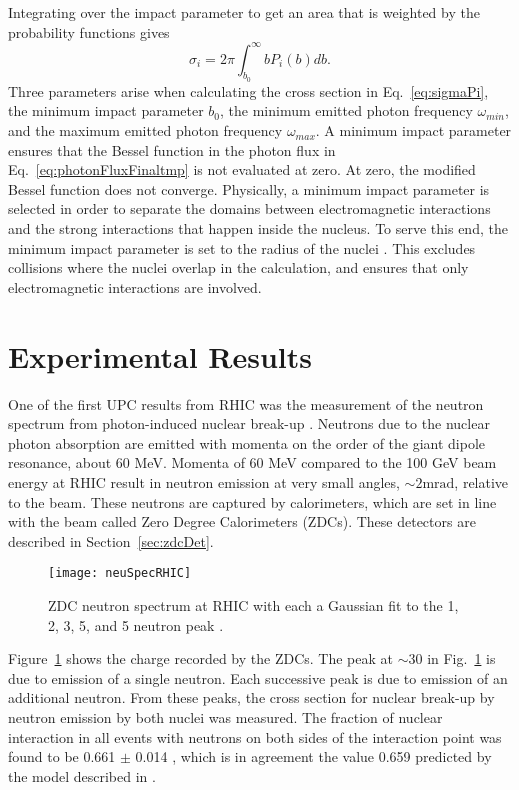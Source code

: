     Integrating over the impact parameter to get an area that 
      is weighted by the probability functions gives \cite{emPCite3,emPCite4}
      \begin{equation}
        \sigma_{i}=2\pi\int^{\infty}_{b_{0}}bP_{i}(b)db.
        \label{eq:sigmaPi}
      \end{equation}
    Three parameters arise when calculating the cross section in Eq.~\ref{eq:sigmaPi}, the 
      minimum impact parameter $b_{0}$, the minimum emitted photon frequency 
      $\omega_{min}$, and the maximum emitted photon frequency $\omega_{max}$.
    A minimum impact parameter ensures that the Bessel 
      function in the photon flux in Eq.~\ref{eq:photonFluxFinaltmp} is not
      evaluated at zero.
    At zero, the modified Bessel function does not converge.
    Physically, a minimum impact parameter is selected in order to separate the
      domains between electromagnetic interactions and the strong interactions 
      that happen inside the nucleus.
    To serve this end, the minimum impact parameter is set to the radius of the
      nuclei \cite{emPCite3,emPCite4}.
    This excludes collisions where the nuclei overlap in the calculation, and 
      ensures that only electromagnetic interactions are involved.

  \section{Experimental Results}
  One of the first UPC results from RHIC was the measurement of the neutron 
    spectrum from photon-induced nuclear break-up \cite{upcNeuPHENIX}.
  Neutrons due to the nuclear photon absorption are emitted with momenta on the
    order of the giant dipole resonance, about 60 MeV.
  Momenta of 60 MeV compared to the 100 GeV beam energy at RHIC result in 
    neutron emission at very small angles, $\sim 2 \textrm{mrad}$, relative to 
    the beam.
  These neutrons are captured by calorimeters, which are set in line with the 
    beam called Zero Degree Calorimeters (ZDCs).
  These detectors are described in Section~\ref{sec:zdcDet}.
  \begin{figure}[!Hhbt]
    \centering
    \texttt{[image: neuSpecRHIC]}
    \caption{ZDC neutron spectrum at RHIC with each a Gaussian fit 
       to the 1, 2, 3, 5, and 5 neutron peak \cite{upcNeuPHENIX}.}
    \label{fig:neuSpecRHIC}
  \end{figure}
  Figure~\ref{fig:neuSpecRHIC} shows the charge recorded by the ZDCs.
  The peak at $\sim 30$ in Fig.~\ref{fig:neuSpecRHIC} is due to emission of a 
    single neutron. 
  Each successive peak is due to emission of an additional neutron. 
  From these peaks, the cross section for nuclear break-up by neutron 
    emission by both nuclei was measured.
  The fraction of nuclear interaction in all events with neutrons on both sides
    of the interaction point was found to be 0.661 $\pm$ 0.014 \cite{upcNeuPHENIX},
    which is in agreement the value 0.659 predicted by the model described in 
    \cite{emPCite4}.

